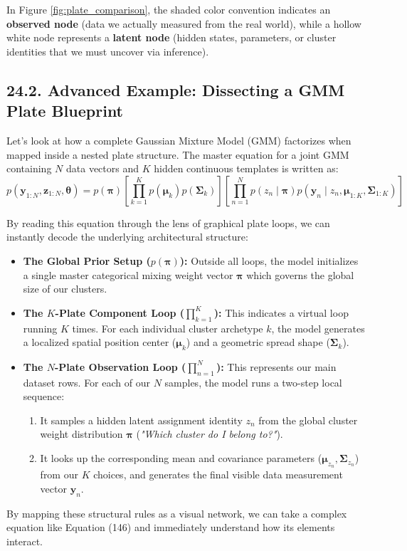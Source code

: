 \documentclass{article}
\begin{document}
In Figure \ref{fig:plate_comparison}, the shaded color convention indicates an \textbf{observed node} (data we actually measured from the real world), while a hollow white node represents a \textbf{latent node} (hidden states, parameters, or cluster identities that we must uncover via inference).

\subsection*{24.2. Advanced Example: Dissecting a GMM Plate Blueprint}
Let's look at how a complete Gaussian Mixture Model (GMM) factorizes when mapped inside a nested plate structure. The master equation for a joint GMM containing $N$ data vectors and $K$ hidden continuous templates is written as:
\begin{equation}
p(\mathbf{y}_{1:N}, \mathbf{z}_{1:N}, \boldsymbol{\theta}) = p(\boldsymbol{\pi}) \left[ \prod_{k=1}^K p(\boldsymbol{\mu}_k) p(\boldsymbol{\Sigma}_k) \right] \left[ \prod_{n=1}^N p(z_n \mid \boldsymbol{\pi}) p(\mathbf{y}_n \mid z_n, \boldsymbol{\mu}_{1:K}, \boldsymbol{\Sigma}_{1:K}) \right] \tag{146}
\end{equation}

By reading this equation through the lens of graphical plate loops, we can instantly decode the underlying architectural structure:

\begin{itemize}
    \item \textbf{The Global Prior Setup ($p(\boldsymbol{\pi})$):} Outside all loops, the model initializes a single master categorical mixing weight vector $\boldsymbol{\pi}$ which governs the global size of our clusters.
    \item \textbf{The $K$-Plate Component Loop ($\prod_{k=1}^K$):} This indicates a virtual loop running $K$ times. For each individual cluster archetype $k$, the model generates a localized spatial position center ($\boldsymbol{\mu}_k$) and a geometric spread shape ($\boldsymbol{\Sigma}_k$).
    \item \textbf{The $N$-Plate Observation Loop ($\prod_{n=1}^N$):} This represents our main dataset rows. For each of our $N$ samples, the model runs a two-step local sequence:
    \begin{enumerate}
        \item It samples a hidden latent assignment identity $z_n$ from the global cluster weight distribution $\boldsymbol{\pi}$ (\textit{"Which cluster do I belong to?"}).
        \item It looks up the corresponding mean and covariance parameters ($\boldsymbol{\mu}_{z_n}, \boldsymbol{\Sigma}_{z_n}$) from our $K$ choices, and generates the final visible data measurement vector $\mathbf{y}_n$.
    \end{enumerate}
\end{itemize}

By mapping these structural rules as a visual network, we can take a complex equation like Equation (146) and immediately understand how its elements interact.
\end{document}
